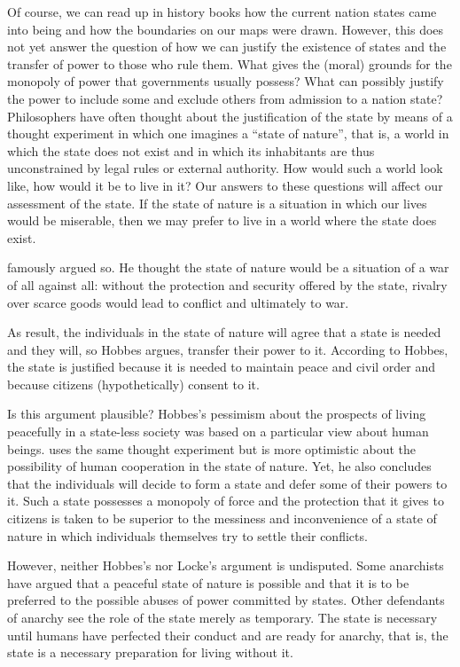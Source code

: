 \documentclass[11pt]{article}
\begin{document}
Of course, we can read up in history books how the current nation states came into being and how the boundaries on our maps were drawn. However, this does not yet answer the question of how we can justify the existence of states and the transfer of power to those who rule them. What gives the (moral) grounds for the monopoly of power that governments usually possess? What can possibly justify the power to include some and exclude others from admission to a nation state?
Philosophers have often thought about the justification of the state by means of a thought experiment in which one imagines a “state of nature”, that is, a world in which the state does not exist and in which its inhabitants are thus unconstrained by legal rules or external authority. How would such a world look like, how would it be to live in it? Our answers to these questions will affect our assessment of the state. If the state of nature is a situation in which our lives would be miserable, then we may prefer to live in a world where the state does exist.


\textcite{Hobbes1651} famously argued so. He thought the state of nature would be a situation of a war of all against all: without the protection and security offered by the state, rivalry over scarce goods would lead to conflict and ultimately to war.

As result, the individuals in the state of nature will agree that a state is needed and they will, so Hobbes argues, transfer their power to it. According to Hobbes,
the state is justified because it is needed to maintain peace and civil order and because citizens (hypothetically) consent to it.

Is this argument plausible? Hobbes’s pessimism about the prospects of living peacefully in a state-less society was based on a particular view about human beings. \textcite{Locke1689} uses the same thought experiment but is more optimistic about the possibility of human cooperation in the state of nature. Yet, he also concludes that the individuals will decide to form a state and defer some of their powers to it. Such a state possesses a monopoly of force and the protection that it gives to citizens is taken to be superior to the messiness and inconvenience of a state of nature in which individuals themselves try to settle their conflicts.

However, neither Hobbes’s nor Locke’s argument is undisputed. Some anarchists have argued that a peaceful state of nature is possible and that it is to be preferred to the possible abuses of power committed by states. Other defendants of anarchy see the role of the state merely as temporary. The state is necessary until humans have perfected their conduct and are ready for anarchy, that is, the state is a necessary preparation for living without it.
\end{document}
